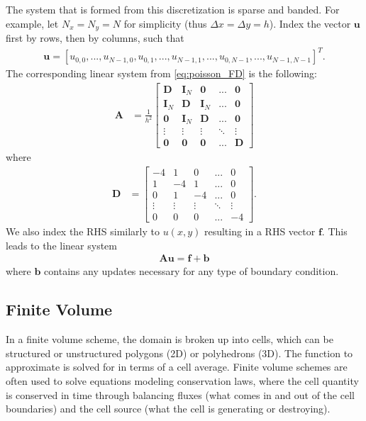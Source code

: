 The system that is formed from this discretization is sparse and banded. For example, let $N_x = N_y = N$ for simplicity (thus $\Delta x = \Delta y = h$). Index the vector $\textbf{u}$ first by rows, then by columns, such that
\begin{align}
    \textbf{u} = [u_{0,0}, ..., u_{N - 1, 0}, u_{0, 1}, ..., u_{N - 1, 1}, ..., u_{0, N - 1}, ..., u_{N - 1, N - 1}]^T.
\end{align}
The corresponding linear system from \ref{eq:poisson_FD} is the following:
\begin{align}
    \textbf{A} &= \frac{1}{h^2}
    \begin{bmatrix}
        \textbf{D} & \textbf{I}_{N} & \textbf{0} & ... & \textbf{0} \\
        \textbf{I}_{N} & \textbf{D} & \textbf{I}_{N} & ... & \textbf{0} \\
        \textbf{0} & \textbf{I}_{N} & \textbf{D} & ... & \textbf{0} \\
        \vdots & \vdots & \vdots & \ddots & \vdots \\
        \textbf{0} & \textbf{0} & \textbf{0} & ... & \textbf{D}
    \end{bmatrix}
\end{align}
where
\begin{align}
    \textbf{D} &= 
    \begin{bmatrix}
        -4 & 1 & 0 & ... & 0 \\
        1 & -4 & 1 & ... & 0 \\
        0 & 1 & -4 & ... & 0 \\
        \vdots & \vdots & \vdots & \ddots & \vdots \\
        0 & 0 & 0 & ... & -4
    \end{bmatrix}.
\end{align}
We also index the RHS similarly to $u(x,y)$ resulting in a RHS vector $\textbf{f}$. This leads to the linear system
\begin{align}
    \textbf{A} \textbf{u} = \textbf{f} + \textbf{b}
\end{align}
where $\textbf{b}$ contains any updates necessary for any type of boundary condition.

\subsection{Finite Volume}

In a finite volume scheme, the domain is broken up into cells, which can be structured or unstructured polygons (2D) or polyhedrons (3D). The function to approximate is solved for in terms of a cell average. Finite volume schemes are often used to solve equations modeling conservation laws, where the cell quantity is conserved in time through balancing fluxes (what comes in and out of the cell boundaries) and the cell source (what the cell is generating or destroying).

